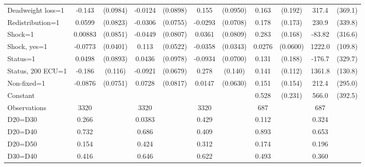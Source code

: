 \begin{tabular}{l|cccccc|cc|cc}
Deadweight loss=1&   -0.143         & (0.0984)&  -0.0124         & (0.0898)&    0.155         & (0.0950)&    0.163         &  (0.192)&    317.4         &  (369.1)\\
Redistribution=1&   0.0599         & (0.0823)&  -0.0306         & (0.0755)&  -0.0293         & (0.0708)&    0.178         &  (0.173)&    230.9         &  (339.8)\\
Shock=1         &  0.00883         & (0.0851)&  -0.0449         & (0.0807)&   0.0361         & (0.0809)&    0.283\sym{*}  &  (0.168)&   -83.82         &  (316.6)\\
Shock, yes=1    &  -0.0773\sym{*}  & (0.0401)&    0.113\sym{**} & (0.0522)&  -0.0358         & (0.0343)&   0.0276         & (0.0600)&   1222.0\sym{***}&  (109.8)\\
Status=1        &   0.0498         & (0.0893)&   0.0436         & (0.0978)&  -0.0934         & (0.0700)&    0.131         &  (0.188)&   -176.7         &  (329.7)\\
Status, 200 ECU=1&   -0.186         &  (0.116)&  -0.0921         & (0.0679)&    0.278\sym{**} &  (0.140)&    0.141         &  (0.112)&   1361.8\sym{***}&  (130.8)\\
Non-fixed=1     &  -0.0876         & (0.0751)&   0.0728         & (0.0817)&   0.0147         & (0.0630)&    0.151         &  (0.154)&    212.4         &  (295.0)\\
Constant        &                  &         &                  &         &                  &         &    0.528\sym{**} &  (0.231)&    566.0         &  (392.5)\\
\hline
Observations    &     3320         &         &     3320         &         &     3320         &         &      687         &         &      687         &         \\
D20=D30         &    0.266         &         &   0.0383         &         &    0.429         &         &    0.112         &         &    0.324         &         \\
D20=D40         &    0.732         &         &    0.686         &         &    0.409         &         &    0.893         &         &    0.653         &         \\
D20=D50         &    0.154         &         &    0.424         &         &    0.312         &         &    0.174         &         &    0.196         &         \\
D30=D40         &    0.416         &         &    0.646         &         &    0.622         &         &    0.493         &         &    0.360         &         \\

\end{tabular}
